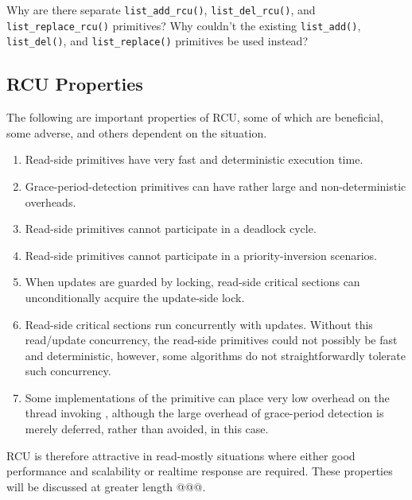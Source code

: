 \QuickQuiz{}
	Why are there separate {\tt list\_add\_rcu()},
	{\tt list\_del\_rcu()},
	and {\tt list\_replace\_rcu()} primitives?
	Why couldn't the existing {\tt list\_add()}, {\tt list\_del()},
	and {\tt list\_replace()} primitives be used instead?
 \QuickQuizEnd

\subsection{RCU Properties}
\label{sec:advsync:RCU Properties}

The following are important properties of RCU, some of which are
beneficial, some adverse, and others dependent on the situation.

\begin{enumerate}
\item	Read-side primitives have very fast and deterministic
	execution time.
\item	Grace-period-detection primitives can have rather large
	and non-deterministic overheads.
\item	Read-side primitives cannot participate in a deadlock cycle.
\item	Read-side primitives cannot participate in a priority-inversion
	scenarios.
\item	When updates are guarded by locking, read-side critical
	sections can unconditionally acquire the update-side lock.
\item	Read-side critical sections run concurrently with updates.
	Without this read/update concurrency, the read-side primitives could
	not possibly be fast and deterministic, however, some algorithms
	do not straightforwardly tolerate such concurrency.
\item	Some implementations of the  primitive
	can place very low overhead on the thread invoking
	, although the large overhead of grace-period
	detection is merely deferred, rather than avoided, in this
	case.
\end{enumerate}

RCU is therefore attractive in read-mostly situations where either
good performance and scalability or realtime response are required.
These properties will be discussed at greater length @@@.

